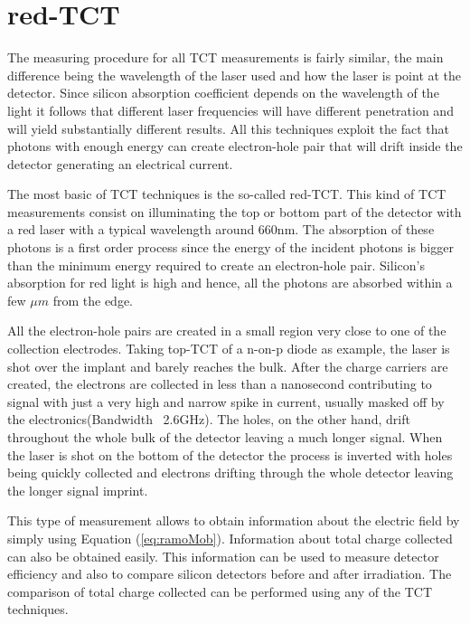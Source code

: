 \section{red-TCT} %
\label{sec:redTCT}

The measuring procedure for all TCT measurements is fairly similar, the main difference being the wavelength of the laser used and how the laser is point at the detector. Since silicon absorption coefficient depends on the wavelength of the light it follows that different laser frequencies will have different penetration and will yield substantially different results. All this techniques exploit the fact that photons with enough energy can create electron-hole pair that will drift inside the detector generating an electrical current. 

The most basic of TCT techniques is the so-called red-TCT. This kind of TCT measurements consist on illuminating the top or bottom part of the detector with a red laser with a typical wavelength around 660nm. The absorption of these photons is a first order process since the energy of the incident photons is bigger than the minimum energy required to create an electron-hole pair. Silicon's absorption for red light is high and hence, all the photons are absorbed within a few $\mu m$ from the edge. 

All the electron-hole pairs are created in a small region very close to one of the collection electrodes. Taking top-TCT of a n-on-p diode as example, the laser is shot over the implant and barely reaches the bulk. After the charge carriers are created, the electrons are collected in less than a nanosecond contributing to signal with just a very high and narrow spike in current, usually masked off by the electronics(Bandwidth ~2.6GHz). The holes, on the other hand, drift throughout the whole bulk of the detector leaving a much longer signal. When the laser is shot on the bottom of the detector the process is inverted with holes being quickly collected and electrons drifting through the whole detector leaving the longer signal imprint.

This type of measurement allows to obtain information about the electric field by simply using Equation (\ref{eq:ramoMob}). Information about total charge collected can also be obtained easily. This information can be used to measure detector efficiency and also to compare silicon detectors before and after irradiation. The comparison of total charge collected can be performed using any of the TCT techniques.

